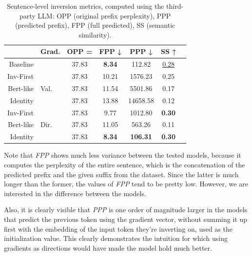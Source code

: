\documentclass[../thesis.tex]{subfiles}
\begin{document}
\begin{table}[htbp]
\centering
\begin{tabular}{rlccccc}
\toprule
           & \textbf{Grad.} & \textbf{OPP =}  & \textbf{FPP ↓}   & \textbf{PPP ↓}  & \textbf{SS ↑}    \\
\midrule
Baseline   &                & 37.83           & \textbf{8.34}    & 112.82          & \underline{0.28} \\
\midrule
Inv-First  &                & 37.83           & 10.21            & 1576.23         & 0.25             \\
Bert-like  & Val.           & 37.83           & 11.54            & 5501.86         & 0.17             \\
Identity   &                & 37.83           & 13.88            & 14658.58        & 0.12             \\
\midrule
Inv-First  &                & 37.83           & 9.77             & 1012.80         & \textbf{0.30}    \\
Bert-like  & Dir.           & 37.83           & 11.05            & 563.26          & 0.11             \\
Identity   &                & 37.83           & \textbf{8.34}    & \textbf{106.31} & \textbf{0.30}    \\
\bottomrule
\end{tabular}
\vspace{0.25cm}
\caption{Sentence-level inversion metrics, computed using the third-party LLM: OPP (original prefix perplexity), PPP (predicted prefix), FPP (full predicted), SS (semantic similarity).}
\label{tab:ilm-evaluation-sentences-metrics-llama}
\end{table}

Note that \emph{FPP} shows much less variance between the tested models, because it computes the perplexity of the entire sentence, which is the concatenation of the predicted prefix and the given suffix from the dataset. Since the latter is much longer than the former, the values of \emph{FPP} tend to be pretty low. However, we are interested in the difference between the models.

Also, it is clearly visible that \emph{PPP} is one order of magnitude larger in the models that predict the previous token using the gradient vector, without summing it up first with the embedding of the input token they're inverting on, used as the initialization value.
This clearly demonstrates the intuition for which using gradients as directions would have made the model hold much better.
\end{document}
